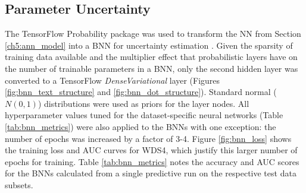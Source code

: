 \subsection{Parameter Uncertainty}\label{ch5:param_uncertainty}

The TensorFlow Probability package was used to transform the NN from Section \ref{ch5:ann_model} into a BNN for uncertainty estimation \citep{dillon_tensorflow_2017}.  Given the sparsity of training data available and the multiplier effect that probabilistic layers have on the number of trainable parameters in a BNN, only the second hidden layer was converted to a TensorFlow \textit{DenseVariational} layer (Figures \ref{fig:bnn_text_structure} and \ref{fig:bnn_dot_structure}). Standard normal ($N(0,1)$) distributions were used as priors for the layer nodes. All hyperparameter values tuned for the dataset-specific neural networks (Table \ref{tab:bnn_metrics}) were also applied to the BNNs with one exception: the number of epochs was increased by a factor of 3-4. Figure \ref{fig:bnn_loss} shows the training loss and AUC curves for WDS4, which justify this larger number of epochs for training. Table \ref{tab:bnn_metrics} notes the accuracy and AUC scores for the BNNs calculated from a single predictive run on the respective test data subsets.

